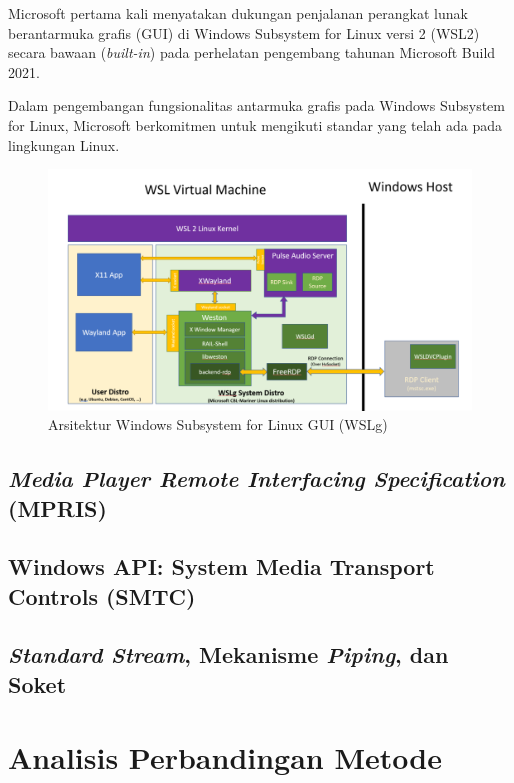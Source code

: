 Microsoft pertama kali menyatakan dukungan penjalanan perangkat lunak berantarmuka grafis (GUI) di Windows Subsystem for Linux versi 2 (WSL2) secara bawaan (\textit{built-in}) pada perhelatan pengembang tahunan Microsoft Build 2021.

Dalam pengembangan fungsionalitas antarmuka grafis pada Windows Subsystem for Linux, Microsoft berkomitmen untuk mengikuti standar yang telah ada pada lingkungan Linux.

\begin{figure}
    \centering
    \includegraphics[width=0.5\linewidth]{wslg-architecture.png}
    \caption{Arsitektur Windows Subsystem for Linux GUI (WSLg)}
    \label{fig:enter-label}
\end{figure}



\subsection{\textit{Media Player Remote Interfacing Specification} (MPRIS)}

\subsection{Windows API: System Media Transport Controls (SMTC)}

\subsection{\textit{Standard Stream}, Mekanisme \textit{Piping}, dan Soket}

\section{Analisis Perbandingan Metode}

